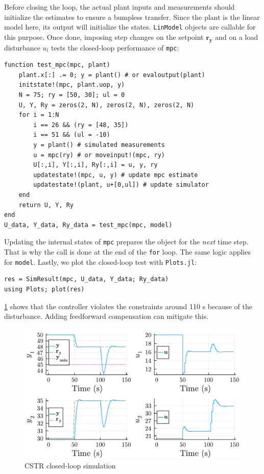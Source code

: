 Before closing the loop, the actual plant inputs and measurements should initialize the estimates to ensure a bumpless transfer. Since the plant is the linear model here, its output will initialize the states. \texttt{LinModel} objects are callable for this purpose. Once done, imposing step changes on the setpoint $\mathbf{r_y}$ and on a load disturbance $u_l$ tests the closed-loop performance of \texttt{mpc}:
\begin{verbatim}
function test_mpc(mpc, plant)
    plant.x[:] .= 0; y = plant() # or evaloutput(plant)
    initstate!(mpc, plant.uop, y)
    N = 75; ry = [50, 30]; ul = 0
    U, Y, Ry = zeros(2, N), zeros(2, N), zeros(2, N)
    for i = 1:N
        i == 26 && (ry = [48, 35])
        i == 51 && (ul = -10)
        y = plant() # simulated measurements
        u = mpc(ry) # or moveinput!(mpc, ry)
        U[:,i], Y[:,i], Ry[:,i] = u, y, ry
        updatestate!(mpc, u, y) # update mpc estimate
        updatestate!(plant, u+[0,ul]) # update simulator
    end
    return U, Y, Ry
end
U_data, Y_data, Ry_data = test_mpc(mpc, model)
\end{verbatim}
Updating the internal states of \texttt{mpc} prepares the object for the \emph{next} time step. That is why the call is done at the end of the \texttt{for} loop. The same logic applies for \texttt{model}. Lastly, we plot the closed-loop test with \texttt{Plots.jl}:
\begin{verbatim}
res = SimResult(mpc, U_data, Y_data; Ry_data)
using Plots; plot(res)
\end{verbatim}
\cref{fig:plot1_LinMPC} shows that the controller violates the constraints around 110 s because of the disturbance. Adding feedforward compensation can mitigate this.

\begin{figure}
    \centering
    \includegraphics[width=\columnwidth]{fig/plot1_LinMPC.pdf}
    \caption{CSTR closed-loop simulation}
    \label{fig:plot1_LinMPC}
\end{figure}

